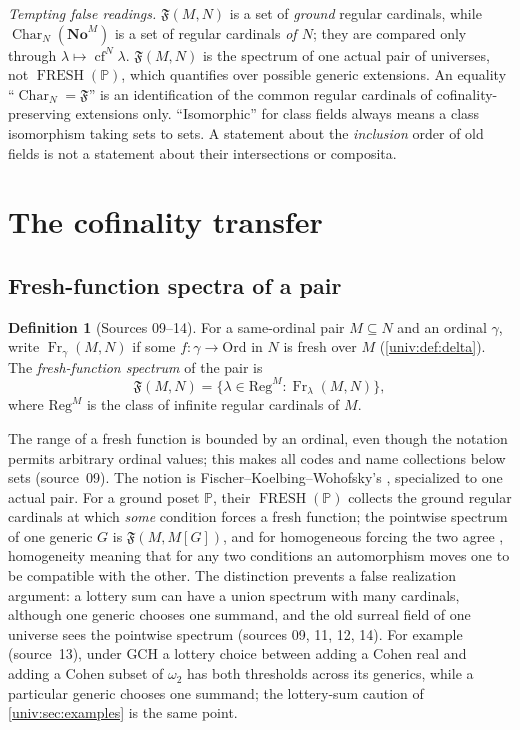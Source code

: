 \documentclass[11pt,letterpaper]{article}
\numberwithin{equation}{section}
\theoremstyle{definition}
\newtheorem{definition}[definition]{Definition}
\theoremstyle{remark}
\newcommand{\No}{\mathbf{No}}
\newcommand{\NoM}{\No^{M}}
\newcommand{\Ord}{\mathrm{Ord}}
\newcommand{\cf}{\operatorname{cf}}
\newcommand{\Char}{\operatorname{Char}}
\newcommand{\FF}{\mathfrak F}
\newcommand{\Fr}{\operatorname{Fr}}
\newcommand{\FRESH}{\operatorname{FRESH}}
\newcommand{\Reg}{\mathrm{Reg}}
\begin{document}
\emph{Tempting false readings.} $\FF(M,N)$ is a set of \emph{ground} regular
cardinals, while $\Char_N(\NoM)$ is a set of regular cardinals \emph{of $N$}; they
are compared only through $\lambda\mapsto\cf^N\lambda$. $\FF(M,N)$ is the spectrum
of one actual pair of universes, not $\FRESH(\mathbb P)$, which quantifies over
possible generic extensions. An equality ``$\Char_N=\FF$'' is an identification of
the common regular cardinals of cofinality-preserving extensions only.
``Isomorphic'' for class fields always means a class isomorphism taking sets to
sets. A statement about the \emph{inclusion} order of old fields is not a
statement about their intersections or composita.

\section{The cofinality transfer}\label{univ:gs:sec:transfer}

\subsection{Fresh-function spectra of a pair}

\begin{definition}[Sources 09--14]\label{univ:gs:def:ff}
For a same-ordinal pair $M\subseteq N$ and an ordinal $\gamma$, write
$\Fr_\gamma(M,N)$ if some $f:\gamma\to\Ord$ in $N$ is fresh over $M$
(\cref{univ:def:delta}). The \emph{fresh-function spectrum} of the pair is
\[
 \FF(M,N)=\{\lambda\in\Reg^M:\Fr_\lambda(M,N)\},
\]
where $\Reg^M$ is the class of infinite regular cardinals of $M$.
\end{definition}

The range of a fresh function is bounded by an ordinal, even though the notation
permits arbitrary ordinal values; this makes all codes and name collections below
sets (source~09). The notion is Fischer--Koelbing--Wohofsky's \cite{FKW},
specialized to one actual pair. For a ground poset $\mathbb P$, their
$\FRESH(\mathbb P)$ collects the ground regular cardinals at which \emph{some}
condition forces a fresh function; the pointwise spectrum of one generic $G$ is
$\FF(M,M[G])$, and for homogeneous forcing the two agree
\cite[Proposition~4.3]{FKW}, homogeneity meaning that for any two conditions an
automorphism moves one to be compatible with the other. The distinction prevents
a false realization argument: a lottery sum can have a union spectrum with many
cardinals, although one generic chooses one summand, and the old surreal field of
one universe sees the pointwise spectrum (sources 09, 11, 12, 14). For example
(source~13), under GCH a lottery choice between adding a Cohen real and adding a
Cohen subset of $\omega_2$ has both thresholds across its generics, while a
particular generic chooses one summand; the lottery-sum caution of
\cref{univ:sec:examples} is the same point.
\end{document}
